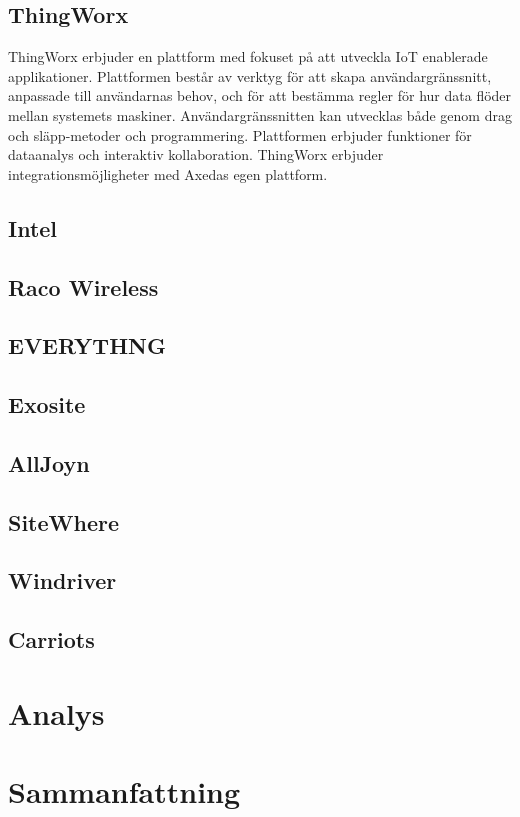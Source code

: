 \subsection{ThingWorx}
ThingWorx erbjuder en plattform med fokuset på att utveckla IoT enablerade
applikationer. Plattformen består av verktyg för att skapa användargränssnitt,
anpassade till användarnas behov, och för att bestämma regler för hur
data flöder mellan systemets maskiner. Användargränssnitten kan utvecklas
både genom drag och släpp-metoder och programmering.
Plattformen erbjuder funktioner för dataanalys och interaktiv kollaboration.
ThingWorx erbjuder integrationsmöjligheter med Axedas egen plattform.


\subsection{Intel}

\subsection{Raco Wireless}

\subsection{EVERYTHNG}

\subsection{Exosite}

\subsection{AllJoyn}

\subsection{SiteWhere}

\subsection{Windriver}

\subsection{Carriots}


\section{Analys}
\label{sec:esimluku}



\section{Sammanfattning}


